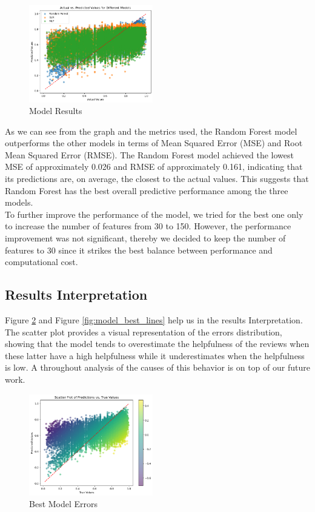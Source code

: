 \begin{figure}[H]
    \centering
    \includegraphics[width=0.48\textwidth]{./figures/model_results.png}
    \caption{Model Results}
    \label{fig:model_results}
\end{figure}

\noindent
As we can see from the graph and the metrics used, the Random Forest model outperforms the other models in terms of Mean Squared Error 
(MSE) and Root Mean Squared Error (RMSE). The Random Forest model achieved the lowest MSE of approximately 0.026 and RMSE of approximately 
0.161, indicating that its predictions are, on average, the closest to the actual values. 
This suggests that Random Forest has the best overall predictive performance among the three models.\\
To further improve the performance of the model, we tried for the best one only to increase the number of features from 30 to 150. However,
the performance improvement was not significant, thereby we decided to keep the number of features to 30 since it strikes the best balance
between performance and computational cost.

\subsection{Results Interpretation}
Figure \ref{fig:model_best_scatter} and Figure \ref{fig:model_best_lines} help us in the results Interpretation. The scatter plot
provides a visual representation of the errors distribution, showing that the model tends to overestimate the helpfulness of the reviews when 
these latter have a high helpfulness while it underestimates when the helpfulness is low. A throughout analysis of the causes of this behavior
is on top of our future work.\\

\begin{figure}[H]
    \centering
    \includegraphics[width=0.48\textwidth]{./figures/model_best_scatter.png}
    \caption{Best Model Errors}
    \label{fig:model_best_scatter}
\end{figure}

